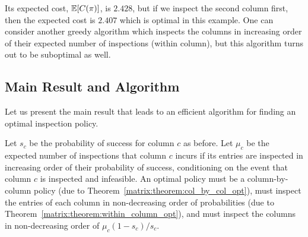 Its expected cost, $\mathbb{E}[C(\pi)]$, is $2.428$, but if we inspect the second column first, then the expected cost is $2.407$ which is optimal in this example.
 One can consider another greedy algorithm which inspects the columns in increasing order of their expected number of inspections (within column), but this algorithm turns out to be suboptimal as well. 


 \subsection{Main Result and Algorithm}
 Let us present the main result that leads to an efficient algorithm for finding an optimal inspection policy. 

 \begin{theorem} \label{matrix:thm:main_result}
 	Let $s_c$ be the probability of success for column $c$ as before. 
 	Let $\mu_c$ be the expected number of inspections that column $c$ incurs if its entries are inspected in increasing order of their probability of success, conditioning on the event that column $c$ is inspected and infeasible.
 	An optimal policy must be a column-by-column policy (due to Theorem~\ref{matrix:theorem:col_by_col_opt}), must inspect the entries of each column in non-decreasing order of probabilities (due to Theorem~\ref{matrix:theorem:within_column_opt}), and must inspect the columns in non-decreasing order of $\mu_c(1 - s_c)/s_c$.
 \end{theorem}
